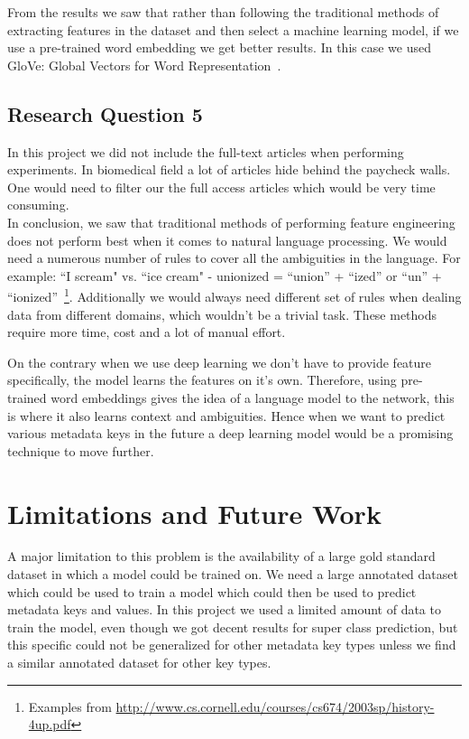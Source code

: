 From the results we saw that rather than following the traditional methods of extracting features in the dataset and then select a machine learning model, if we use a pre-trained word embedding we get better results. In this case we used GloVe: Global Vectors for Word Representation~\cite{pennington2014glove}. 

\subsection{Research Question 5}
In this project we did not include the full-text articles when performing experiments. In biomedical field a lot of articles hide behind the paycheck walls. One would need to filter our the full access articles which would be very time consuming.  
\\

In conclusion, we saw that traditional methods of performing feature engineering does not perform best when it comes to natural language processing. We would need a numerous number of rules to cover all the ambiguities in the language. For example: ``I scream" vs. ``ice cream" - unionized = ``union” + ``ized” or ``un” + ``ionized”~\footnote{Examples from \url{http://www.cs.cornell.edu/courses/cs674/2003sp/history-4up.pdf}}. Additionally we would always need different set of rules when dealing data from different domains, which wouldn't be a trivial task. These methods require more time, cost and a lot of manual effort. 

On the contrary when we use deep learning we don't have to provide feature specifically, the model learns the features on it's own. Therefore, using pre-trained word embeddings gives the idea of a language model to the network, this is where it also learns context and ambiguities. Hence when we want to predict various metadata keys in the future a deep learning model would be a promising technique to move further. 

\section{Limitations and Future Work}\label{sec:futurework}
A major limitation to this problem is the availability of a large gold standard dataset in which a model could be trained on. We need a large annotated dataset which could be used to train a model which could then be used to predict metadata keys and values. In this project we used a limited amount of data to train the model, even though we got decent results for super class prediction, but this specific could not be generalized for other metadata key types unless we find a similar annotated dataset for other key types. 

